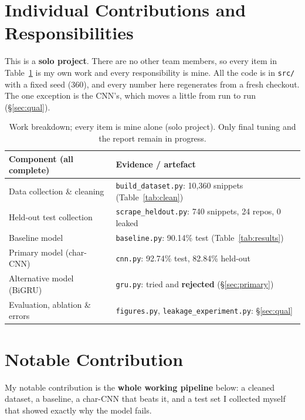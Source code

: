 \documentclass{article}
\begin{document}
\section{Individual Contributions and Responsibilities}
\label{sec:contrib}
\vspace{-4pt}

This is a \textbf{solo project}. There are no other team members, so every item in
Table~\ref{tab:contrib} is my own work and every responsibility is mine. All the code is in \texttt{src/} with a fixed seed (360), and every number here regenerates from a
fresh checkout. The one exception is the CNN's, which moves a little from run to run
(\S\ref{sec:qual}).

\begin{table}[h]
\centering\scriptsize
\caption{Work breakdown; every item is mine alone (solo project). Only final tuning and the report
remain in progress.}
\label{tab:contrib}
\vspace{-3pt}
\begin{tabular}{@{}lp{9.4cm}@{}}
\toprule
\textbf{Component (all complete)} & \textbf{Evidence / artefact} \\
\midrule
Data collection \& cleaning & \texttt{build\_dataset.py}: 10{,}360 snippets (Table~\ref{tab:clean}) \\
Held-out test collection    & \texttt{scrape\_heldout.py}: 740 snippets, 24 repos, 0 leaked \\
Baseline model              & \texttt{baseline.py}: 90.14\% test (Table~\ref{tab:results}) \\
Primary model (char-CNN)    & \texttt{cnn.py}: 92.74\% test, 82.84\% held-out \\
Alternative model (BiGRU)   & \texttt{gru.py}: tried and \textbf{rejected} (\S\ref{sec:primary}) \\
Evaluation, ablation \& errors & \texttt{figures.py}, \texttt{leakage\_experiment.py}: \S\ref{sec:qual} \\
\bottomrule
\end{tabular}
\vspace{-8pt}
\end{table}

\vspace{-4pt}
\section{Notable Contribution}
\vspace{-4pt}

My notable contribution is the \textbf{whole working pipeline} below: a cleaned dataset, a baseline,
a char-CNN that beats it, and a test set I collected myself that showed exactly why the model fails.
\vspace{-6pt}
\end{document}
